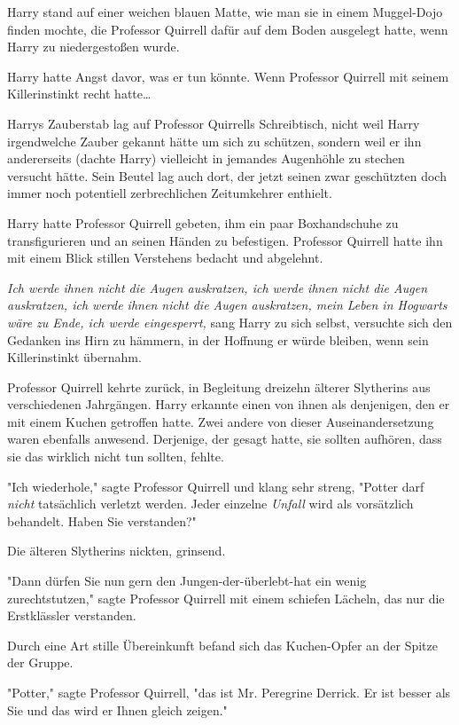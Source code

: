 {Harry stand auf einer weichen blauen Matte, wie man sie in einem Muggel-Dojo finden mochte, die Professor Quirrell dafür auf dem Boden ausgelegt hatte, wenn Harry zu niedergestoßen wurde.

Harry hatte Angst davor, was er tun könnte. Wenn Professor Quirrell mit seinem Killerinstinkt recht hatte…

Harrys Zauberstab lag auf Professor Quirrells Schreibtisch, nicht weil Harry irgendwelche Zauber gekannt hätte um sich zu schützen, sondern weil er ihn andererseits (dachte Harry) vielleicht in jemandes Augenhöhle zu stechen versucht hätte. Sein Beutel lag auch dort, der jetzt seinen zwar geschützten doch immer noch potentiell zerbrechlichen Zeitumkehrer enthielt.

Harry hatte Professor Quirrell gebeten, ihm ein paar Boxhandschuhe zu transfigurieren und an seinen Händen zu befestigen. Professor Quirrell hatte ihn mit einem Blick stillen Verstehens bedacht und abgelehnt.

\emph{Ich werde ihnen nicht die Augen auskratzen, ich werde ihnen nicht die Augen auskratzen, ich werde ihnen nicht die Augen auskratzen, mein Leben in Hogwarts wäre zu Ende, ich werde eingesperrt,} sang Harry zu sich selbst, versuchte sich den Gedanken ins Hirn zu hämmern, in der Hoffnung er würde bleiben, wenn sein Killerinstinkt übernahm.

Professor Quirrell kehrte zurück, in Begleitung dreizehn älterer Slytherins aus verschiedenen Jahrgängen. Harry erkannte einen von ihnen als denjenigen, den er mit einem Kuchen getroffen hatte. Zwei andere von dieser Auseinandersetzung waren ebenfalls anwesend. Derjenige, der gesagt hatte, sie sollten aufhören, dass sie das wirklich nicht tun sollten, fehlte.

"Ich wiederhole," sagte Professor Quirrell und klang sehr streng, "Potter darf \emph{nicht} tatsächlich verletzt werden. Jeder einzelne \emph{Unfall} wird als vorsätzlich behandelt. Haben Sie verstanden?"

Die älteren Slytherins nickten, grinsend.

"Dann dürfen Sie nun gern den Jungen-der-überlebt-hat ein wenig zurechtstutzen," sagte Professor Quirrell mit einem schiefen Lächeln, das nur die Erstklässler verstanden.

Durch eine Art stille Übereinkunft befand sich das Kuchen-Opfer an der Spitze der Gruppe.

"Potter," sagte Professor Quirrell, "das ist Mr. Peregrine Derrick. Er ist besser als Sie und das wird er Ihnen gleich zeigen."

}

